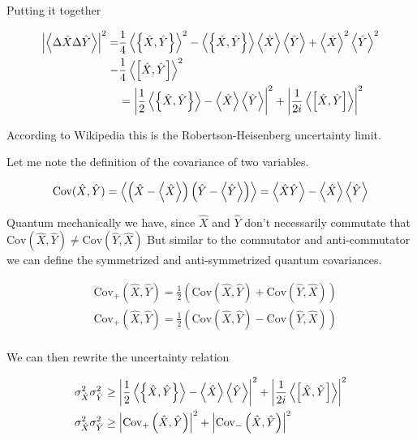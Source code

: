 \documentclass[12pt]{article}
\begin{document}
Putting it together

\begin{align}
\left \lvert \Braket{\Delta\hat{X} \Delta\hat{Y}} \right \rvert^2 = &\frac{1}{4}\Braket{\left\{\hat{X}, \hat{Y}\right\}}^2 - \Braket{\left\{\hat{X},\hat{Y}\right\}}\Braket{\hat{X}}\Braket{\hat{Y}}+\Braket{\hat{X}}^2\Braket{\hat{Y}}^2\\
-&\frac{1}{4}\Braket{\left[\hat{X}, \hat{Y}\right]}^2\\
&= \left\lvert\frac{1}{2}\Braket{\left\{\hat{X},\hat{Y}\right\}} - \Braket{\hat{X}}\Braket{\hat{Y}}\right\rvert^2 + \left\lvert\frac{1}{2i}\Braket{\left[\hat{X},\hat{Y}\right]} \right\rvert^2
\end{align}

According to Wikipedia this is the Robertson-Heisenberg uncertainty limit. 

Let me note the definition of the covariance of two variables.

\begin{align}
\text{Cov}(\hat{X},\hat{Y}) = \Braket{\left(\hat{X}-\Braket{\hat{X}}\right)\left(\hat{Y}-\Braket{\hat{Y}}\right)}=\Braket{\hat{X}\hat{Y}}-\Braket{\hat{X}}\Braket{\hat{Y}}
\end{align}

Quantum mechanically we have, since $\hat{X}$ and $\hat{Y}$ don't necessarily commutate that $\text{Cov}\left(\hat{X},\hat{Y}\right) \neq \text{Cov}\left(\hat{Y},\hat{X}\right)$ But similar to the commutator and anti-commutator we can define the symmetrized and anti-symmetrized quantum covariances.

\begin{align}
&\text{Cov}_+\left(\hat{X},\hat{Y}\right) = \frac{1}{2}\left(\text{Cov}\left(\hat{X},\hat{Y}\right) + \text{Cov}\left(\hat{Y},\hat{X}\right)\right)\\
&\text{Cov}_+\left(\hat{X},\hat{Y}\right) = \frac{1}{2}\left(\text{Cov}\left(\hat{X},\hat{Y}\right) - \text{Cov}\left(\hat{Y},\hat{X}\right)\right)\\
\end{align}

We can then rewrite the uncertainty relation

\begin{align}
&\sigma_{\hat{X}}^2\sigma_{\hat{Y}}^2 \ge \left\lvert\frac{1}{2}\Braket{\left\{\hat{X},\hat{Y}\right\}} - \Braket{\hat{X}}\Braket{\hat{Y}}\right\rvert^2 + \left\lvert\frac{1}{2i}\Braket{\left[\hat{X},\hat{Y}\right]} \right\rvert^2\\
&\sigma_{\hat{X}}^2\sigma_{\hat{Y}}^2 \ge \left\lvert\text{Cov}_+\left(\hat{X},\hat{Y}\right) \right\rvert^2
+ \left\lvert\text{Cov}_-\left(\hat{X},\hat{Y}\right) \right\rvert^2
\end{align}
\end{document}
